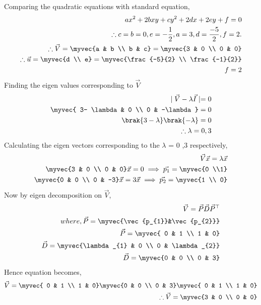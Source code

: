 
Comparing the quadratic equations with standard equation,
\begin{align}
    ax^2+2bxy+cy^2+2dx+2ey+f=0\\
    \therefore c=b=0,e=-\frac{1}{2}, a=3,d=\frac{-5}{2},f=2.\\
    \therefore \vec{V}=\myvec{a & b \\ b & c}=\myvec{3 & 0 \\ 0 & 0}\\ \therefore \vec{u}=\myvec{d \\ e}= \myvec{\frac{-5}{2} \\ \frac{-1}{2}}\\ f=2
\end{align}
 Finding the eigen values corresponding to  $\vec{V}$
\begin{align}
    \mid \vec{V}- \lambda \vec{I} \mid =0\\
    \myvec{ 3- \lambda & 0 \\ 0 & -\lambda}=0\\
    \brak{3 - \lambda}\brak{-\lambda}=0 \\
    \therefore \lambda = 0 ,3 
\end{align}
Calculating the eigen vectors corresponding to the $\lambda$ = 0 ,3 respectively,
\begin{align}
    \vec{V}\vec{x}=\lambda\vec{x}\\
    \myvec{3 & 0 \\ 0 & 0}\vec{x}=0 \implies \vec{p_{1}}=\myvec{0 \\1}\\
    \myvec{0 & 0 \\ 0 & -3}\vec{x} = 3\vec{x} \implies \vec{p_{2}}= \myvec{1 \\ 0} \\
\end{align}
Now by eigen decomposition on $\vec{V}$,
\begin{align}
    \vec{V}= \vec{P}\vec{D}\vec{P}^{\top}\\
    where,\vec{P}= \myvec{\vec{p_{1}}&\vec{p_{2}}}\\
    \vec{P}=\myvec{ 0 & 1 \\ 1 & 0}\\
    \vec{D}= \myvec{\lambda_{1} & 0 \\ 0 & \lambda_{2}}\\
    \vec{D}= \myvec{0 & 0 \\ 0 & 3}
\end{align}
Hence equation becomes,
\begin{align}
    \vec{V}= \myvec{ 0 & 1 \\ 1 & 0}\myvec{0 & 0 \\ 0 & 3}\myvec{ 0 & 1 \\ 1 & 0}\\
    \therefore \vec{V}=\myvec{3 & 0 \\ 0 & 0}
\end{align}
